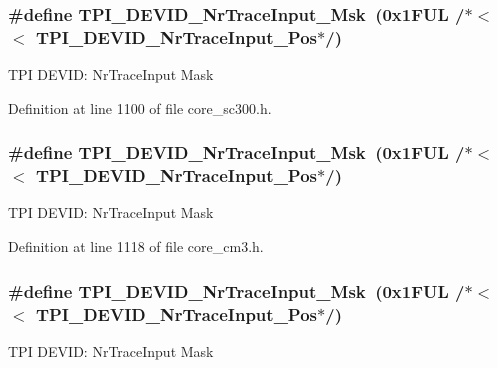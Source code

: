\subsubsection[{\texorpdfstring{T\+P\+I\+\_\+\+D\+E\+V\+I\+D\+\_\+\+Nr\+Trace\+Input\+\_\+\+Msk}{TPI_DEVID_NrTraceInput_Msk}}]{\setlength{\rightskip}{0pt plus 5cm}\#define T\+P\+I\+\_\+\+D\+E\+V\+I\+D\+\_\+\+Nr\+Trace\+Input\+\_\+\+Msk~(0x1\+F\+U\+L /$\ast$$<$$<$ T\+P\+I\+\_\+\+D\+E\+V\+I\+D\+\_\+\+Nr\+Trace\+Input\+\_\+\+Pos$\ast$/)}\hypertarget{group___c_m_s_i_s___t_p_i_gabed454418d2140043cd65ec899abd97f}{}\label{group___c_m_s_i_s___t_p_i_gabed454418d2140043cd65ec899abd97f}
T\+PI D\+E\+V\+ID\+: Nr\+Trace\+Input Mask 

Definition at line 1100 of file core\+\_\+sc300.\+h.

\subsubsection[{\texorpdfstring{T\+P\+I\+\_\+\+D\+E\+V\+I\+D\+\_\+\+Nr\+Trace\+Input\+\_\+\+Msk}{TPI_DEVID_NrTraceInput_Msk}}]{\setlength{\rightskip}{0pt plus 5cm}\#define T\+P\+I\+\_\+\+D\+E\+V\+I\+D\+\_\+\+Nr\+Trace\+Input\+\_\+\+Msk~(0x1\+F\+U\+L /$\ast$$<$$<$ T\+P\+I\+\_\+\+D\+E\+V\+I\+D\+\_\+\+Nr\+Trace\+Input\+\_\+\+Pos$\ast$/)}\hypertarget{group___c_m_s_i_s___t_p_i_gabed454418d2140043cd65ec899abd97f}{}\label{group___c_m_s_i_s___t_p_i_gabed454418d2140043cd65ec899abd97f}
T\+PI D\+E\+V\+ID\+: Nr\+Trace\+Input Mask 

Definition at line 1118 of file core\+\_\+cm3.\+h.

\subsubsection[{\texorpdfstring{T\+P\+I\+\_\+\+D\+E\+V\+I\+D\+\_\+\+Nr\+Trace\+Input\+\_\+\+Msk}{TPI_DEVID_NrTraceInput_Msk}}]{\setlength{\rightskip}{0pt plus 5cm}\#define T\+P\+I\+\_\+\+D\+E\+V\+I\+D\+\_\+\+Nr\+Trace\+Input\+\_\+\+Msk~(0x1\+F\+U\+L /$\ast$$<$$<$ T\+P\+I\+\_\+\+D\+E\+V\+I\+D\+\_\+\+Nr\+Trace\+Input\+\_\+\+Pos$\ast$/)}\hypertarget{group___c_m_s_i_s___t_p_i_gabed454418d2140043cd65ec899abd97f}{}\label{group___c_m_s_i_s___t_p_i_gabed454418d2140043cd65ec899abd97f}
T\+PI D\+E\+V\+ID\+: Nr\+Trace\+Input Mask 

